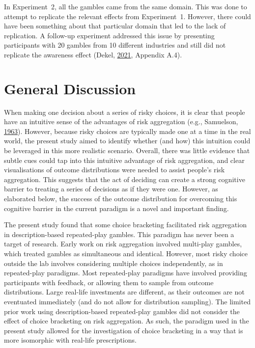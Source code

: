\documentclass[
  english,
  man, donotrepeattitle,floatsintext]{apa7}
\theoremstyle{definition}
\theoremstyle{definition}
\theoremstyle{definition}
\theoremstyle{definition}
\theoremstyle{remark}
\begin{document}
In Experiment~2, all the gambles came from the same domain. This was done to
attempt to replicate the relevant effects from Experiment~1. However, there
could have been something about that particular domain that led to the lack of
replication. A follow-up experiment addressed this issue by presenting
participants with 20 gambles from 10 different industries and still did not
replicate the awareness effect (Dekel, \protect\hyperlink{ref-dekel2021b}{2021}, Appendix A.4).

\hypertarget{general-discussion}{%
\section{General Discussion}\label{general-discussion}}

When making one decision about a series of risky choices, it is clear that
people have an intuitive sense of the advantages of risk aggregation (e.g., Samuelson, \protect\hyperlink{ref-samuelson1963}{1963}). However, because risky choices are typically made one at a time
in the real world, the present study aimed to identify whether (and how) this
intuition could be leveraged in this more realistic scenario. Overall, there was
little evidence that subtle cues could tap into this intuitive advantage of risk
aggregation, and clear visualisations of outcome distributions were needed to
assist people's risk aggregation. This suggests that the act of deciding can
create a strong cognitive barrier to treating a series of decisions as if they
were one. However, as elaborated below, the success of the outcome distribution
for overcoming this cognitive barrier in the current paradigm is a novel and
important finding.

The present study found that some choice bracketing facilitated risk aggregation in
description-based repeated-play gambles. This paradigm has never been a target
of research. Early work on risk aggregation involved multi-play gambles, which
treated gambles as simultaneous and identical. However, most risky choice
outside the lab involves considering multiple choices independently, as in
repeated-play paradigms. Most repeated-play paradigms have involved providing
participants with feedback, or allowing them to sample from outcome
distributions. Large real-life investments are different, as their outcomes are
not eventuated immediately (and do not allow for distribution sampling). The
limited prior work using description-based repeated-play gambles did not
consider the effect of choice bracketing on risk aggregation. As such, the
paradigm used in the present study allowed for the investigation of choice bracketing
in a way that is more isomorphic with real-life prescriptions.
\end{document}

